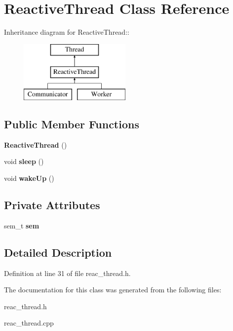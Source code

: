 \section{Reactive\-Thread Class Reference}
\label{class_reactive_thread}
Inheritance diagram for Reactive\-Thread::\begin{figure}[H]
\begin{center}
\leavevmode
\includegraphics[height=3cm]{class_reactive_thread}
\end{center}
\end{figure}
\subsection*{Public Member Functions}
\begin{CompactItemize}
\item 
{\bf Reactive\-Thread} ()\label{class_reactive_thread_77381649429941c99a3e3d568113d6cf}

\item 
void {\bf sleep} ()\label{class_reactive_thread_8263c2a32d8c99a49a05f1a7717d4262}

\item 
void {\bf wake\-Up} ()\label{class_reactive_thread_a724a54575de10f09cc03ab7aa4e59ce}

\end{CompactItemize}
\subsection*{Private Attributes}
\begin{CompactItemize}
\item 
sem\_\-t {\bf sem}\label{class_reactive_thread_915e5a42dc8cb1bcf6738d5fe883a4e7}

\end{CompactItemize}


\subsection{Detailed Description}




Definition at line 31 of file reac\_\-thread.h.

The documentation for this class was generated from the following files:\begin{CompactItemize}
\item 
reac\_\-thread.h\item 
reac\_\-thread.cpp\end{CompactItemize}

